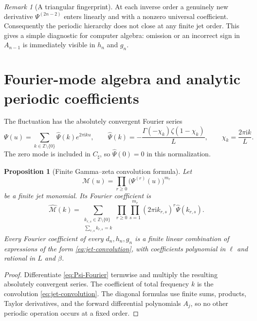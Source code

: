 \documentclass[11pt,oneside]{article}
\numberwithin{equation}{section}
\newtheorem{proposition}[theorem]{Proposition}
\theoremstyle{definition}
\theoremstyle{remark}
\newtheorem{remark}[theorem]{Remark}
\newcommand{\Z}{\mathbb Z}
\newcommand{\ii}{\mathrm i}
\newcommand{\Psihat}{\widehat\Psi}
\newcommand{\Csharp}{C_{\sharp}}
\begin{document}
\begin{remark}[A triangular fingerprint]
At each inverse order a genuinely new derivative $\Psi^{(2n-2)}$ enters linearly and with a nonzero universal coefficient.  Consequently the periodic hierarchy does not close at any finite jet order.  This gives a simple diagnostic for computer algebra: omission or an incorrect sign in $A_{n-1}$ is immediately visible in $h_n$ and $g_n$.
\end{remark}

\section{Fourier-mode algebra and analytic periodic coefficients}
\label{sec:fourier-algebra}

The fluctuation has the absolutely convergent Fourier series
\begin{equation}
 \Psi(u)=\sum_{k\in\Z\setminus\{0\}}\Psihat(k)e^{2\pi\ii ku},
 \qquad
 \Psihat(k)=-\frac{\Gamma(-\chi_k)\zeta(1-\chi_k)}L,
 \qquad
 \chi_k=\frac{2\pi\ii k}{L}.
 \label{eq:Psi-Fourier-recap}
\end{equation}
The zero mode is included in $\Csharp$, so $\Psihat(0)=0$ in this normalization.

\begin{proposition}[Finite Gamma--zeta convolution formula]
\label{prop:convolution}
Let
\begin{equation}
 \mathcal M(u)=\prod_{r\ge0}\bigl(\Psi^{(r)}(u)\bigr)^{m_r}
 \label{eq:jet-monomial}
\end{equation}
be a finite jet monomial.  Its Fourier coefficient is
\begin{equation}
 \widehat{\mathcal M}(k)=
 \sum_{\substack{k_{r,s}\in\Z\setminus\{0\}\\
 \sum_{r,s}k_{r,s}=k}}
 \prod_{r\ge0}\prod_{s=1}^{m_r}
 (2\pi\ii k_{r,s})^r\Psihat(k_{r,s}).
 \label{eq:jet-convolution}
\end{equation}
Every Fourier coefficient of every $d_n,h_n,g_n$ is a finite linear combination of expressions of the form \cref{eq:jet-convolution}, with coefficients polynomial in $\ell$ and rational in $L$ and $\beta$.
\end{proposition}

\begin{proof}
Differentiate \cref{eq:Psi-Fourier} termwise and multiply the resulting absolutely convergent series.  The coefficient of total frequency $k$ is the convolution \cref{eq:jet-convolution}.  The diagonal formulas use finite sums, products, Taylor derivatives, and the forward differential polynomials $A_j$, so no other periodic operation occurs at a fixed order.
\end{proof}
\end{document}
